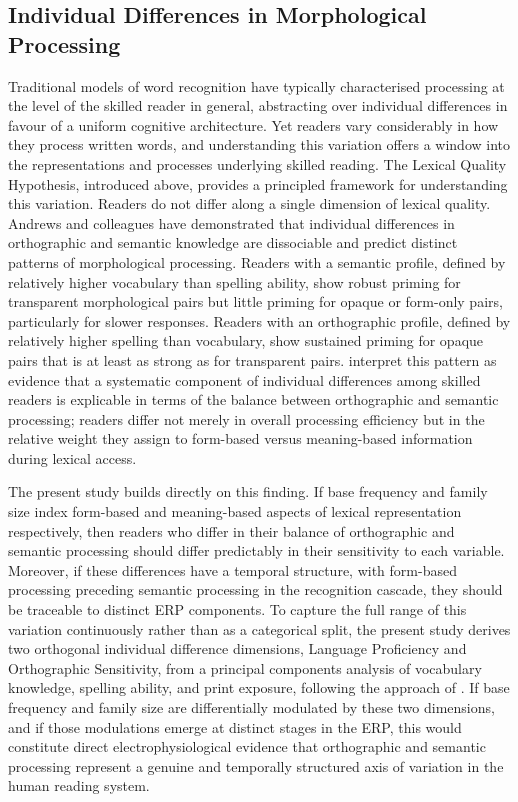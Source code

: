 	
	\subsection{Individual Differences in Morphological Processing}
	
	Traditional models of word recognition have typically characterised processing at the level of the skilled reader in general, abstracting over individual differences in favour of a uniform cognitive architecture. Yet readers vary considerably in how they process written words, and understanding this variation offers a window into the representations and processes underlying skilled reading. The Lexical Quality Hypothesis, introduced above, provides a principled framework for understanding this variation. Readers do not differ along a single dimension of lexical quality. Andrews and colleagues  \citep{andrewsIndividualDifferencesSkilled2012, andrewsMorphologicalPrimingStronger2013} have demonstrated that individual differences in orthographic and semantic knowledge are dissociable and predict distinct patterns of morphological processing. Readers with a semantic profile, defined by relatively higher vocabulary than spelling ability, show robust priming for transparent morphological pairs but little priming for opaque or form-only pairs, particularly for slower responses. Readers with an orthographic profile, defined by relatively higher spelling than vocabulary, show sustained priming for opaque pairs that is at least as strong as for transparent pairs. \citet{andrewsMorphologicalPrimingStronger2013} interpret this pattern as evidence that a systematic component of individual differences among skilled readers is explicable in terms of the balance between orthographic and semantic processing; readers differ not merely in overall processing efficiency but in the relative weight they assign to form-based versus meaning-based information during lexical access.
	
	The present study builds directly on this finding. If base frequency and family size index form-based and meaning-based aspects of lexical representation respectively, then readers who differ in their balance of orthographic and semantic processing should differ predictably in their sensitivity to each variable. Moreover, if these differences have a temporal structure, with form-based processing preceding semantic processing in the recognition cascade, they should be traceable to distinct ERP components. To capture the full range of this variation continuously rather than as a categorical split, the present study derives two orthogonal individual difference dimensions, Language Proficiency and Orthographic Sensitivity, from a principal components analysis of vocabulary knowledge, spelling ability, and print exposure, following the approach of \citet{andrewsMorphologicalPrimingStronger2013}. If base frequency and family size are differentially modulated by these two dimensions, and if those modulations emerge at distinct stages in the ERP, this would constitute direct electrophysiological evidence that orthographic and semantic processing represent a genuine and temporally structured axis of variation in the human reading system.
	
